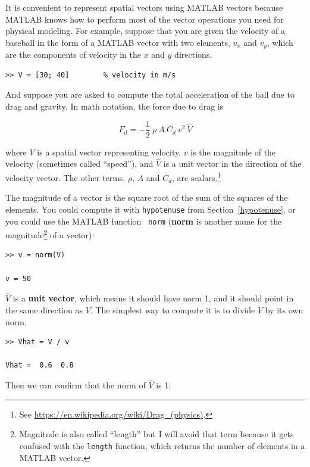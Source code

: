 \documentclass{book}
\newcommand{\uvec}[1]{\hat{#1}}
\begin{document}
It is convenient to represent spatial vectors using MATLAB vectors
because MATLAB knows how to perform most of the vector
operations you need for physical modeling.  For example,
suppose that you are given the velocity of a baseball in
the form of a MATLAB vector with two elements, $v_x$ and $v_y$,
which are the components of velocity in the $x$ and $y$ directions.

\begin{verbatim}
>> V = [30; 40]        % velocity in m/s
\end{verbatim}

And suppose you are asked to compute the total acceleration of
the ball due to drag and gravity.  In math notation, the force
due to drag is

\begin{equation}
F_d = -\frac{1}{2} ~ \rho ~ A ~ C_d ~ v^2 ~ \uvec{V}
\end{equation}

where $V$ is a spatial vector representing velocity, $v$ is the magnitude
of the velocity (sometimes called ``speed''), and $\uvec{V}$ is a unit
vector in the direction of the velocity vector.  The other terms,
$\rho$, $A$ and $C_d$, are scalars.\footnote{See
\url{https://en.wikipedia.org/wiki/Drag_(physics)}.}

The magnitude of a vector is the square root of the sum of the squares
of the elements.  You could compute it with {\tt hypotenuse} from
Section~\ref{hypotenuse}, or you could use the MATLAB function {\tt
norm} ({\bf norm} is another name  for the magnitude\footnote{Magnitude
is also called ``length'' but I will avoid that term because it gets
confused with the {\tt length} function, which returns the number of
elements in a MATLAB vector.} of a vector):

\begin{verbatim}
>> v = norm(V)

v = 50
\end{verbatim}

$\uvec{V}$ is a {\bf unit vector}, which means it should have norm 1,
and it should point in the same direction as $V$.  The simplest
way to compute it is to divide $V$ by its own norm.

\begin{verbatim}
>> Vhat = V / v

Vhat =  0.6  0.8
\end{verbatim}

Then we can confirm that the norm of $\uvec{V}$ is 1:
\end{document}
